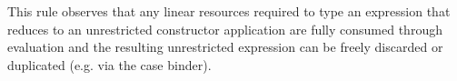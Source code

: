 \documentclass[acmsmall,review,anonymous,screen]{acmart}
\newcommand{\ccase}[2]{\mathsf{case}~#1~\mathsf{of}~#2}
\begin{document}

%
This rule observes that any linear resources required to type an expression
that reduces to an unrestricted constructor application are fully consumed
through evaluation and the resulting unrestricted expression can be freely
discarded or duplicated (e.g. via the case binder).
%
%

\end{document}
